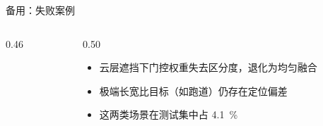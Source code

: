\begin{frame}{备用：失败案例}
  \begin{columns}[T, onlytextwidth]
    \begin{column}{0.46\textwidth}
      \centering
    \end{column}
    \begin{column}{0.50\textwidth}
      \begin{itemize}
        \setlength{\itemsep}{0.7em}
        \item 云层遮挡下门控权重失去区分度，退化为均匀融合
        \item 极端长宽比目标（如跑道）仍存在定位偏差
        \item 这两类场景在测试集中占 \qty{4.1}{\percent}
      \end{itemize}
    \end{column}
  \end{columns}
\end{frame}
